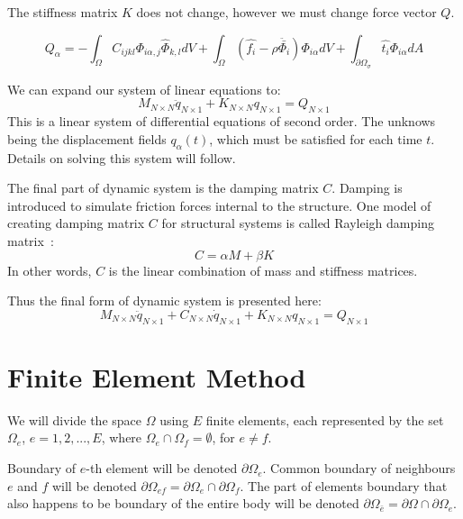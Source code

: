 \documentclass[en]{minipw} %
\begin{document}
The stiffness matrix $K$ does not change, however we must change force vector $Q$.

\begin{equation}
Q_{\alpha} = - \int_{\Omega} C_{ijkl} \Phi_{i \alpha,j} \hat{\Phi}_{k,l} dV + \int_{\Omega} (\hat{f_i} - \rho \ddot{\bar{\Phi_i}} ) \Phi_{i \alpha} dV + \int_{\partial \Omega_{\sigma}} \hat{t_i}\Phi_{i \alpha} dA
\end{equation}

We can expand our system of linear equations to:
\begin{equation}
\label{eq:fem_system}
M_{N \times N}\ddot{q}_{N \times 1} + K_{N \times N} q_{N \times 1} = Q_{N \times 1}
\end{equation}
This is a linear system of differential equations of second order. The unknows being the displacement fields $q_{\alpha}(t)$, which must be satisfied for each time $t$. Details on solving this system will follow.

The final part of dynamic system is the damping matrix $C$. Damping is introduced to simulate friction forces internal to the structure. One model of creating damping matrix $C$ for structural systems is called Rayleigh damping matrix~\cite{damping}:
\begin{equation}
\label{eq:damping_matrix}
C = \alpha M + \beta K
\end{equation}
In other words, $C$ is the linear combination of mass and stiffness matrices.

Thus the final form of dynamic system is presented here:
\begin{equation}
\label{eq:fem_system_damping}
M_{N \times N}\ddot{q}_{N \times 1} + C_{N \times N}\dot{q}_{N \times 1} + K_{N \times N} q_{N \times 1} = Q_{N \times 1}
\end{equation}

\section{Finite Element Method}
We will divide the space $\Omega$ using $E$ finite elements, each represented by the set $\Omega_{e}$, $e = 1,2,...,E$, where $\Omega_{e} \cap \Omega_{f} = \emptyset$, for $e \neq f$.

Boundary of $e$-th element will be denoted $\partial \Omega_{e}$. Common boundary of neighbours $e$ and $f$ will be denoted $\partial \Omega_{ef} = \partial \Omega_e \cap \partial \Omega_f$. The part of elements boundary that also happens to be boundary of the entire body will be denoted $\partial \Omega_{\bar{e}} = \partial \Omega \cap \partial \Omega_{e}$.
\end{document}
